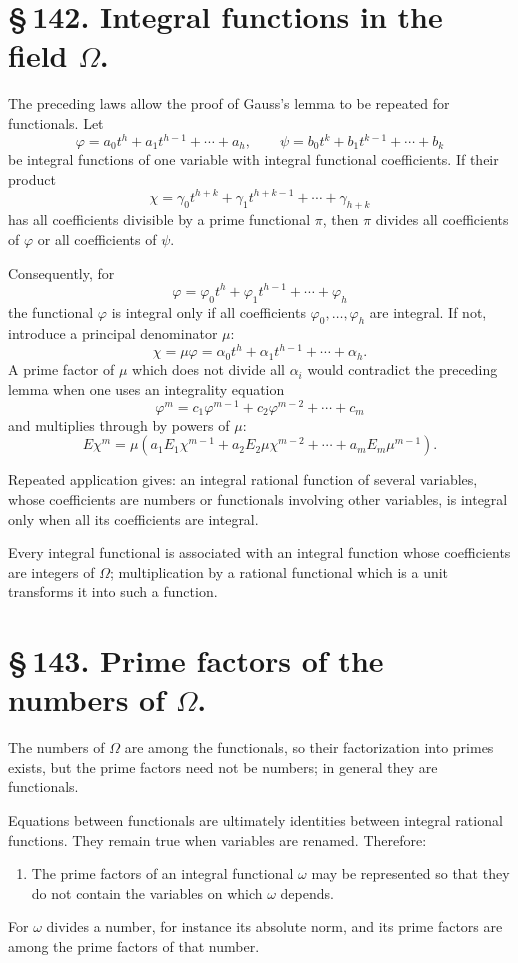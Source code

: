 \documentclass[11pt]{article}
\begin{document}
\section*{\S\,142. Integral functions in the field \(\Omega\).}

The preceding laws allow the proof of Gauss's lemma to be repeated
for functionals. Let
\[
\varphi=a_0t^h+a_1t^{h-1}+\cdots+a_h,\qquad
\psi=b_0t^k+b_1t^{k-1}+\cdots+b_k
\]
be integral functions of one variable with integral functional
coefficients. If their product
\[
\chi=\gamma_0t^{h+k}+\gamma_1t^{h+k-1}+\cdots+\gamma_{h+k}
\]
has all coefficients divisible by a prime functional \(\pi\), then
\(\pi\) divides all coefficients of \(\varphi\) or all coefficients
of \(\psi\).

Consequently, for
\[
\varphi=\varphi_0t^h+\varphi_1t^{h-1}+\cdots+\varphi_h
\tag{1}
\]
the functional \(\varphi\) is integral only if all coefficients
\(\varphi_0,\ldots,\varphi_h\) are integral. If not, introduce a
principal denominator \(\mu\):
\[
\chi=\mu\varphi=\alpha_0t^h+\alpha_1t^{h-1}+\cdots+\alpha_h.
\tag{2}
\]
A prime factor of \(\mu\) which does not divide all \(\alpha_i\)
would contradict the preceding lemma when one uses an integrality
equation
\[
\varphi^m=c_1\varphi^{m-1}+c_2\varphi^{m-2}+\cdots+c_m
\tag{3}
\]
and multiplies through by powers of \(\mu\):
\[
E\chi^m=\mu(a_1E_1\chi^{m-1}+a_2E_2\mu\chi^{m-2}+\cdots+a_mE_m\mu^{m-1}).
\tag{4}
\]

Repeated application gives: an integral rational function of several
variables, whose coefficients are numbers or functionals involving
other variables, is integral only when all its coefficients are
integral.

Every integral functional is associated with an integral function
whose coefficients are integers of \(\Omega\); multiplication by a
rational functional which is a unit transforms it into such a
function.

\section*{\S\,143. Prime factors of the numbers of \(\Omega\).}

The numbers of \(\Omega\) are among the functionals, so their
factorization into primes exists, but the prime factors need not be
numbers; in general they are functionals.

Equations between functionals are ultimately identities between
integral rational functions. They remain true when variables are
renamed. Therefore:
\begin{enumerate}[label=\arabic*.]
\item The prime factors of an integral functional \(\omega\) may be
represented so that they do not contain the variables on which
\(\omega\) depends.
\end{enumerate}
For \(\omega\) divides a number, for instance its absolute norm, and
its prime factors are among the prime factors of that number.
\end{document}
